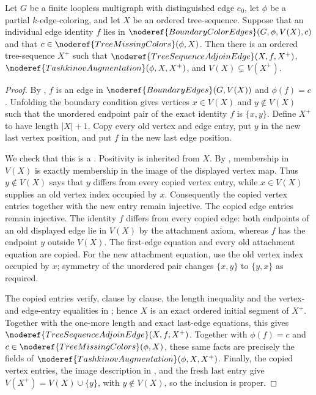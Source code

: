\begin{helper}
Let $G$ be a finite loopless multigraph with distinguished edge $e_0$, let
$\phi$ be a partial $k$-edge-coloring, and let $X$ be an ordered
tree-sequence.  Suppose that an individual edge identity $f$ lies in
$\noderef{BoundaryColorEdges}(G,\phi,V(X),c)$ and that
$c\in\noderef{TreeMissingColors}(\phi,X)$.  Then there is an ordered
tree-sequence $X^+$ such that
$\noderef{TreeSequenceAdjoinEdge}(X,f,X^+)$,
$\noderef{TashkinovAugmentation}(\phi,X,X^+)$, and
$V(X)\subsetneq V(X^+)$.
\end{helper}
\begin{proof}
By , $f$ is an edge in
$\noderef{BoundaryEdges}(G,V(X))$ and $\phi(f)=c$.  Unfolding the boundary
condition gives vertices $x\in V(X)$ and $y\notin V(X)$ such that the
unordered endpoint pair of the exact identity $f$ is $\{x,y\}$.  Define
$X^+$ to have length $|X|+1$.  Copy every old vertex and edge entry, put
$y$ in the new last vertex position, and put $f$ in the new last edge
position.

We check that this is a .  Positivity is inherited
from $X$.  By , membership in $V(X)$ is
exactly membership in the image of the displayed vertex map.  Thus
$y\notin V(X)$ says that $y$ differs from every copied vertex entry, while
$x\in V(X)$ supplies an old vertex index occupied by $x$.  Consequently
the copied vertex entries together with the new entry remain injective.
The copied edge entries remain injective.  The identity $f$ differs from
every copied edge: both endpoints of an old displayed edge lie in $V(X)$
by the attachment axiom, whereas $f$ has the endpoint $y$ outside $V(X)$.
The first-edge equation and every old attachment equation are copied.  For
the new attachment equation, use the old vertex index occupied by $x$;
symmetry of the unordered pair changes $\{x,y\}$ to $\{y,x\}$ as required.

The copied entries verify, clause by clause, the length inequality and the
vertex- and edge-entry equalities in
; hence $X$ is an exact ordered initial
segment of $X^+$.  Together with the one-more length and exact last-edge
equations, this gives
$\noderef{TreeSequenceAdjoinEdge}(X,f,X^+)$.  Together with
$\phi(f)=c$ and $c\in\noderef{TreeMissingColors}(\phi,X)$, these same
facts are precisely the fields of
$\noderef{TashkinovAugmentation}(\phi,X,X^+)$.  Finally, the copied
vertex entries, the image description in
, and the fresh last entry give
$V(X^+)=V(X)\cup\{y\}$, with $y\notin V(X)$, so the inclusion is proper.
\end{proof}
